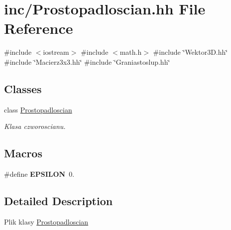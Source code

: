 \hypertarget{_prostopadloscian_8hh}{}\section{inc/\+Prostopadloscian.hh File Reference}
\label{_prostopadloscian_8hh}
{\ttfamily \#include $<$iostream$>$}\newline
{\ttfamily \#include $<$math.\+h$>$}\newline
{\ttfamily \#include \char`\"{}Wektor3\+D.\+hh\char`\"{}}\newline
{\ttfamily \#include \char`\"{}Macierz3x3.\+hh\char`\"{}}\newline
{\ttfamily \#include \char`\"{}Graniastoslup.\+hh\char`\"{}}\newline
\subsection*{Classes}
\begin{DoxyCompactItemize}
\item 
class \mbox{\hyperlink{class_prostopadloscian}{Prostopadloscian}}
\begin{DoxyCompactList}\small\item\em Klasa czworoscianu. \end{DoxyCompactList}\end{DoxyCompactItemize}
\subsection*{Macros}
\begin{DoxyCompactItemize}
\item 
\mbox{\label{_prostopadloscian_8hh_a002b2f4894492820fe708b1b7e7c5e70}} 
\#define {\bfseries E\+P\+S\+I\+L\+ON}~0.
\end{DoxyCompactItemize}


\subsection{Detailed Description}
Plik klasy \mbox{\hyperlink{class_prostopadloscian}{Prostopadloscian}} 